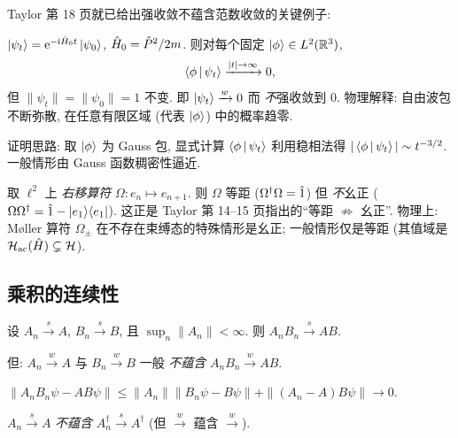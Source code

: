 Taylor 第 18 页就已给出强收敛不蕴含范数收敛的关键例子:

\begin{example}\label{ex:hilbert-freewavepacket}
$\ket{\psi_t}=\mathrm{e}^{-\mathrm{i}\hat{H}_0 t}\ket{\psi_0}$, $\hat{H}_0=\hat{P}^2/2m$. 则对每个固定 $\ket{\phi}\in L^2(\mathbb{R}^3)$,
\begin{equation}\label{eq:hilbert-freedisp}
\left\langle \phi \,\middle|\, \psi_t \right\rangle\xrightarrow{|t|\to\infty} 0,
\end{equation}
但 $\|\psi_t\|=\|\psi_0\|=1$ 不变. 即 $\ket{\psi_t}\xrightarrow{w}0$ 而 \emph{不}强收敛到 $0$. 物理解释: 自由波包不断弥散, 在任意有限区域 (代表 $\ket\phi$) 中的概率趋零.

证明思路: 取 $\ket\phi$ 为 Gauss 包, 显式计算 $\left\langle \phi \,\middle|\, \psi_t \right\rangle$ 利用稳相法得 $|\left\langle \phi \,\middle|\, \psi_t \right\rangle|\sim t^{-3/2}$. 一般情形由 Gauss 函数稠密性逼近.
\end{example}

\begin{example}\label{ex:hilbert-isometric}
取 $\ell^2$ 上 \emph{右移算符} $\Omega:e_n\mapsto e_{n+1}$. 则 $\Omega$ 等距 ($\Omega^\dagger\Omega=\hat{1}$) 但 \emph{不}幺正 ($\Omega\Omega^\dagger=\hat{1}-|e_1\rangle\langle e_1|$). 这正是 Taylor 第 14--15 页指出的``等距 $\not\Rightarrow$ 幺正''. 物理上: Møller 算符 $\Omega_\pm$ 在不存在束缚态的特殊情形是幺正; 一般情形仅是等距 (其值域是 $\mathcal{H}_{\rm ac}(\hat{H})\subsetneq\mathcal{H}$).
\end{example}

\subsection{乘积的连续性}

\begin{proposition}\label{prop:hilbert-product-cont}
设 $A_n\xrightarrow{s}A$, $B_n\xrightarrow{s}B$, 且 $\sup_n\|A_n\|<\infty$. 则 $A_nB_n\xrightarrow{s}AB$.

但: $A_n\xrightarrow{w}A$ 与 $B_n\xrightarrow{w}B$ 一般 \emph{不蕴含} $A_nB_n\xrightarrow{w}AB$.
\end{proposition}

\begin{proof*}[(强情形)]
$\|A_nB_n\psi-AB\psi\|\leq\|A_n\|\|B_n\psi-B\psi\|+\|(A_n-A)B\psi\|\to 0$.
\end{proof*}

\begin{proposition}\label{prop:hilbert-adjoint-noncont}
$A_n\xrightarrow{s}A$ \emph{不蕴含} $A_n^\dagger\xrightarrow{s}A^\dagger$ (但 $\xrightarrow{w}$ 蕴含 $\xrightarrow{w}$).
\end{proposition}

